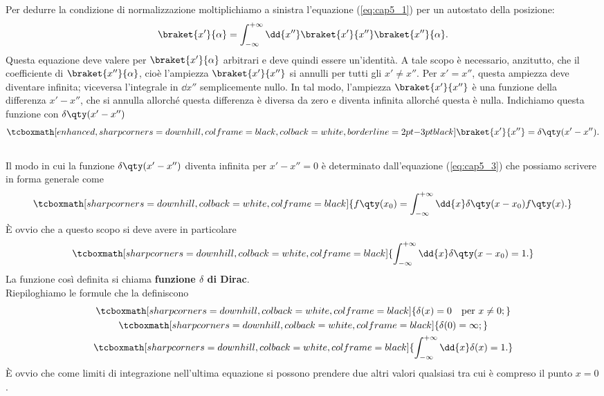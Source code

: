 Per dedurre la condizione di normalizzazione moltiplichiamo a sinistra l'equazione (\ref{eq:cap5_1}) per un autostato della posizione:
	\begin{equation}
	 \label{eq:cap5_3}
		\braket{x'}{\alpha} = \int_{-\infty}^{+\infty}\dd{x''}\braket{x'}{x''}\braket{x''}{\alpha} .
	\end{equation}
Questa equazione deve valere per $\braket{x'}{\alpha}$ arbitrari e deve quindi essere un'identità. A tale scopo è necessario, anzitutto, che il coefficiente di $\braket{x''}{\alpha}$, cioè l'ampiezza $\braket{x'}{x''}$ si annulli per tutti gli $x'\neq x''$. Per $x'=x''$, questa ampiezza deve diventare infinita; viceversa l'integrale in $\dd{x''}$ semplicemente nullo. In tal modo, l'ampiezza $\braket{x'}{x''}$ è una funzione della differenza $x'-x''$, che si annulla allorché questa differenza è diversa da zero e diventa infinita allorché questa è nulla. Indichiamo questa funzione con $\delta\qty(x'-x'')$
	\begin{equation}
		\tcboxmath[enhanced, sharp corners=downhill, colframe=black, colback=white, borderline={2pt}{-3pt}{black}]{
			\braket{x'}{x''} = \delta\qty(x'-x'') .
			}
	\end{equation}\\
	
Il modo in cui la funzione $\delta\qty(x'-x'')$ diventa infinita per $x'-x''=0$ è determinato dall'equazione (\ref{eq:cap5_3}) che possiamo scrivere in forma generale come
	\begin{equation}
		\tcboxmath[sharp corners=downhill, colback=white, colframe=black]{
			f\qty(x_0) = \int_{-\infty}^{+\infty}\dd{x}\delta\qty(x-x_0)f\qty(x) .
			}
	\end{equation}
È ovvio che a questo scopo si deve avere in particolare
	\begin{equation}
		\tcboxmath[sharp corners=downhill, colback=white, colframe=black]{
			\int_{-\infty}^{+\infty}\dd{x}\delta\qty(x-x_0) = 1 .
			}
	\end{equation}
La funzione così definita si chiama \textbf{funzione $\delta$ di Dirac}.\\

Riepiloghiamo le formule che la definiscono
\begin{gather}
  \tcboxmath[sharp corners=downhill, colback=white, colframe=black]{
  	\delta(x) = 0 \quad \text{per }x\neq 0 ;
  		}\\
 \tcboxmath[sharp corners=downhill, colback=white, colframe=black]{
 	\delta(0) = \infty ;}
 	\\
 \tcboxmath[sharp corners=downhill, colback=white, colframe=black]{
 	\int_{-\infty}^{+\infty}\dd{x}\delta(x)=1 .
 	}
\end{gather}
È ovvio che come limiti di integrazione nell'ultima equazione si possono prendere due altri valori qualsiasi tra cui è compreso il punto $x=0$.\\

